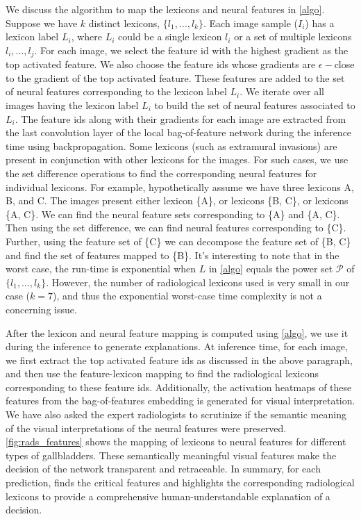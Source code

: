 %
We discuss the algorithm to map the lexicons and neural features in \cref{algo}. Suppose we have $k$ distinct lexicons, $\{l_1, \ldots, l_k\}$. Each image sample ($I_i$) has a lexicon label $L_i$, where $L_i$ could be a single lexicon $l_i$ or a set of multiple lexicons $l_i, \ldots, l_j$. For each image, we select the feature id with the highest gradient as the top activated feature. We also choose the feature ids whose gradients are $\epsilon-$close to the gradient of the top activated feature. These features are added to the set of neural features corresponding to the lexicon label $L_i$. We iterate over all images having the lexicon label $L_i$ to build the set of neural features associated to $L_i$. The feature ids along with their gradients for each image are extracted from the last convolution layer of the local bag-of-feature network during the inference time using backpropagation. Some lexicons (such as extramural invasions) are present in conjunction with other lexicons for the images. For such cases, we use the set difference operations to find the corresponding neural features for individual lexicons. For example, hypothetically assume we have three lexicons A, B, and C. The images present either lexicon \{A\}, or lexicons \{B, C\}, or lexicons \{A, C\}. We can find the neural feature sets corresponding to \{A\} and \{A, C\}. Then using the set difference, we can find neural features corresponding to \{C\}. Further, using the feature set of \{C\} we can decompose the feature set of \{B, C\} and find the set of features mapped to \{B\}. It's interesting to note that in the worst case, the run-time is exponential when $L$ in \cref{algo} equals the power set $\mathcal{P}$ of $\{l_1, \ldots, l_k\}$. However, the number of radiological lexicons used is very small in our case ($k=7$), and thus the exponential worst-case time complexity is not a concerning issue.

\par After the lexicon and neural feature mapping is computed using \cref{algo}, we use it during the inference to generate explanations. At inference time, for each image, we first extract the top activated feature ids as discussed in the above paragraph, and then use the feature-lexicon mapping to find the radiological lexicons corresponding to these feature ids. Additionally, the activation heatmaps of these features from the bag-of-features embedding is generated for visual interpretation. We have also asked the expert radiologists to scrutinize if the semantic meaning of the visual interpretations of the neural features were preserved. \cref{fig:rads_features} shows the mapping of lexicons to neural features for different types of gallbladders. These semantically meaningful visual features make the decision of the network transparent and retraceable. In summary, for each prediction, \radformer finds the critical features and highlights the corresponding radiological lexicons to provide a comprehensive human-understandable explanation of a decision. 


